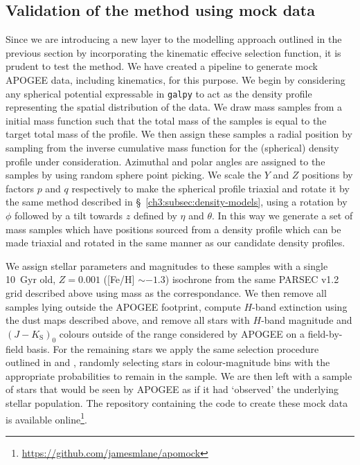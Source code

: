 \subsection{Validation of the method using mock data}
\label{ch3:subsec:method-validation}

Since we are introducing a new layer to the modelling approach outlined in the previous section by incorporating the kinematic effecive selection function, it is prudent to test the method. We have created a pipeline to generate mock APOGEE data, including kinematics, for this purpose. We begin by considering any spherical potential expressable in \texttt{galpy} to act as the density profile representing the spatial distribution of the data. We draw mass samples from a \textcite{chabrier03} initial mass function such that the total mass of the samples is equal to the target total mass of the profile. We then assign these samples a radial position by sampling from the inverse cumulative mass function for the (spherical) density profile under consideration. Azimuthal and polar angles are assigned to the samples by using random sphere point picking. We scale the $Y$ and $Z$ positions by factors $p$ and $q$ respectively to make the spherical profile triaxial and rotate it by the same method described in \S~\ref{ch3:subsec:density-models}, using a rotation by $\phi$ followed by a tilt towards $\hat{z}$ defined by $\eta$ and $\theta$. In this way we generate a set of mass samples which have positions sourced from a density profile which can be made triaxial and rotated in the same manner as our candidate density profiles.

We assign stellar parameters and magnitudes to these samples with a single 10~Gyr old, $Z=0.001$ ([Fe/H] $\sim -1.3$) isochrone from the same PARSEC v1.2 grid described above using mass as the correspondance. We then remove all samples lying outside the APOGEE footprint, compute $H$-band extinction using the dust maps described above, and remove all stars with $H$-band magnitude and $(J-K_\mathrm{S})_{0}$ colours outside of the range considered by APOGEE on a field-by-field basis. For the remaining stars we apply the same selection procedure outlined in \textcite{apogee_targeting} and \textcite{apogee2_targeting}, randomly selecting stars in colour-magnitude bins with the appropriate probabilities to remain in the sample. We are then left with a sample of stars that would be seen by APOGEE as if it had `observed' the underlying stellar population. The repository containing the code to create these mock data is available online\footnote{\url{https://github.com/jamesmlane/apomock}}.

